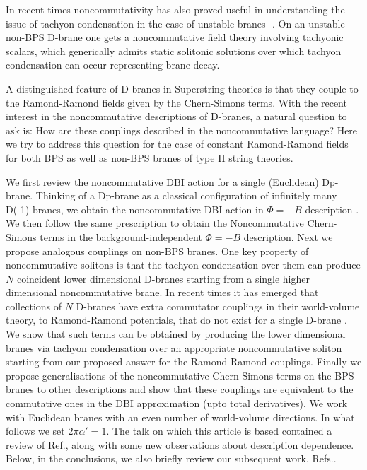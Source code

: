 \documentclass[a4paper,a4paper]{amsproc}
\theoremstyle{definition}
\theoremstyle{remark}
\numberwithin{equation}{section}
\begin{document}
In recent times noncommutativity has also proved useful in
understanding the issue of tachyon condensation in the case of
unstable branes \cite{gmsone}-\cite{sennew}. On an unstable non-BPS
D-brane one gets a noncommutative field theory involving tachyonic
scalars, which generically admits static solitonic solutions over
which tachyon condensation can occur representing brane decay.

A distinguished feature of D-branes in Superstring theories is that
they couple to the Ramond-Ramond fields given by the Chern-Simons
terms. With the recent interest in the noncommutative descriptions of
D-branes, a natural question to ask is: How are these couplings
described in the noncommutative language? Here we try to address this
question for the case of constant Ramond-Ramond fields for both BPS as
well as non-BPS branes of type II string theories.

We first review the noncommutative DBI action for a single (Euclidean)
Dp-brane. Thinking of a Dp-brane as a classical configuration of
infinitely many D(-1)-branes, we obtain the noncommutative DBI action
in $\Phi = -B$ description \cite{cornalba, seibnew}. We then follow
the same prescription to obtain the Noncommutative Chern-Simons terms
in the background-independent $\Phi = -B$ description. Next we propose
analogous couplings on non-BPS branes. One key property of
noncommutative solitons is that the tachyon condensation over them can
produce $N$ coincident lower dimensional D-branes starting from a
single higher dimensional noncommutative brane. In recent times it has
emerged that collections of $N$ D-branes have extra commutator
couplings in their world-volume theory, to Ramond-Ramond potentials,
that do not exist for a single D-brane \cite{myers, twosens}. We show
that such terms can be obtained by producing the lower dimensional
branes via tachyon condensation over an appropriate noncommutative
soliton starting from our proposed answer for the Ramond-Ramond
couplings. Finally we propose generalisations of the noncommutative
Chern-Simons terms on the BPS branes to other descriptions and show
that these couplings are equivalent to the commutative ones in the DBI
approximation (upto total derivatives). We work with Euclidean branes
with an even number of world-volume directions. In what follows we set
$2\pi\alpha' = 1$. The talk on which this article is
based\cite{talklink} contained a
review of Ref.\cite{nccs}, along with some new observations about
description dependence. Below, in the conclusions, we also briefly
review our subsequent work, Refs.\cite{smnvstwo, sdsmnvs}.
\end{document}
